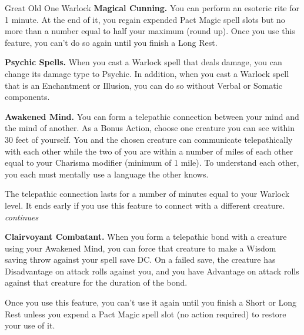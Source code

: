 \begin{Card}[Class]{Great Old One Warlock}
\textbf{Magical Cunning.} You can perform an esoteric rite for 1 minute. At the end of it, you regain expended Pact Magic spell slots but no more than a number equal to half your maximum (round up). Once you use this feature, you can't do so again until you finish a Long Rest.

\textbf{Psychic Spells.} When you cast a Warlock spell that deals damage, you can change its damage type to Psychic. In addition, when you cast a Warlock spell that is an Enchantment or Illusion, you can do so without Verbal or Somatic components.

\textbf{Awakened Mind.} You can form a telepathic connection between your mind and the mind of another. As a Bonus Action, choose one creature you can see within 30 feet of yourself. You and the chosen creature can communicate telepathically with each other while the two of you are within a number of miles of each other equal to your Charisma modifier (minimum of 1 mile). To understand each other, you each must mentally use a language the other knows.

The telepathic connection lasts for a number of minutes equal to your Warlock level. It ends early if you use this feature to connect with a different creature.
\vfill \hfill \textit{\footnotesize continues}
\newpage
{}

\textbf{Clairvoyant Combatant.} When you form a telepathic bond with a creature using your Awakened Mind, you can force that creature to make a Wisdom saving throw against your spell save DC. On a failed save, the creature has Disadvantage on attack rolls against you, and you have Advantage on attack rolls against that creature for the duration of the bond.

Once you use this feature, you can't use it again until you finish a Short or Long Rest unless you expend a Pact Magic spell slot (no action required) to restore your use of it.
\end{Card}

